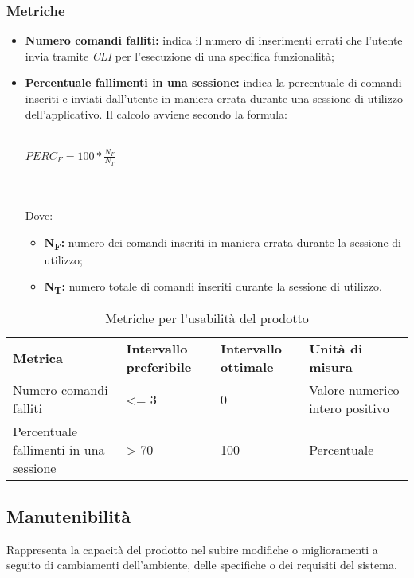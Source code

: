 \subsubsection{Metriche}
\begin{itemize}
	\item \textbf{Numero comandi falliti:} indica il numero di inserimenti errati che l'utente invia tramite \textit{CLI\glos} per l'esecuzione di una specifica funzionalità;
	\item \textbf{Percentuale fallimenti in una sessione:} indica la percentuale di comandi inseriti e inviati dall'utente in maniera errata durante una sessione di utilizzo dell'applicativo. Il calcolo avviene secondo la formula:\\\\
	\centerline{
		\begin{math}
		PERC_{F}=100*\frac{N_{F}}{N_T}
		\end{math}
	}
	\\\\Dove:
	\begin{itemize}
		\item \textbf{N\textsubscript{F}:} numero dei comandi inseriti in maniera errata durante la sessione di utilizzo;
		\item \textbf{N\textsubscript{T}:} numero totale di comandi inseriti durante la sessione di utilizzo.
	\end{itemize}
\end{itemize}

\renewcommand{\arraystretch}{2.2}
\begin{longtable}{|C{4.5cm}|C{2.25cm}|C{2.25cm}|C{3cm}|}

	\caption{Metriche per l'usabilità del prodotto}\\
	\hline

	\textbf{Metrica} & \textbf{Intervallo preferibile}  & \textbf{Intervallo ottimale} & \textbf{Unità di misura}
	\tabularnewline
	\endfirsthead

	Numero comandi falliti &  <= 3 & 0 & Valore numerico intero positivo \\
	Percentuale fallimenti in una sessione &  > 70 & 100 & Percentuale \\
\end{longtable}



\subsection{Manutenibilità}
Rappresenta la capacità del prodotto nel subire modifiche o miglioramenti a seguito di cambiamenti dell'ambiente, delle specifiche o dei requisiti del sistema.

